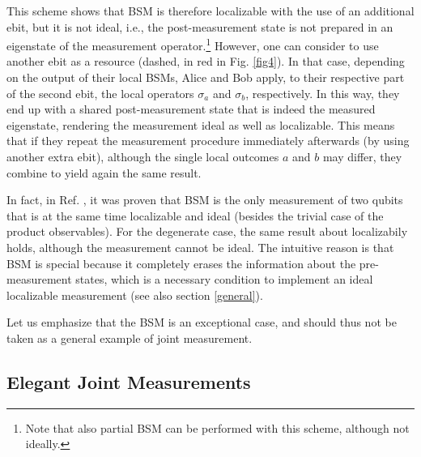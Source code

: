 \documentclass[12pt]{article}
\begin{document}
This scheme shows that BSM is therefore localizable with the use of an additional ebit, but it is not ideal, i.e., the post-measurement state is not prepared in an eigenstate of the measurement operator.\footnote{Note that also partial BSM can be performed with this scheme, although not ideally.} However, one can consider to use another ebit as a resource (dashed, in red in Fig. \ref{fig4}). In that case, depending on the output of their local BSMs, Alice and Bob apply, to their respective part of the second ebit, the local operators $\sigma_a$ and $\sigma_b$, respectively. In this way, they end up with a shared post-measurement state that is indeed the measured eigenstate, rendering the measurement ideal as well as localizable. This means that if they repeat the measurement procedure immediately afterwards (by using another extra ebit), although the single local outcomes $a$ and $b$ may differ, they combine to yield again the same result.


In fact, in Ref. \cite{popescu1994causality}, it was proven that BSM is the only measurement of two qubits that is at the same time localizable and ideal (besides the trivial case of the product observables). For the degenerate case, the same result about localizabily holds, although the measurement cannot be ideal. The intuitive reason is that BSM is special because it completely erases the information about the pre-measurement states, which is a necessary condition to implement an ideal localizable measurement \cite{popescu1994causality} (see also section \ref{general}). 

Let us emphasize that the BSM is an exceptional case, and should thus not be taken as a general example of joint measurement.



\subsection{Elegant Joint Measurements}
\label{ejm}
\end{document}

